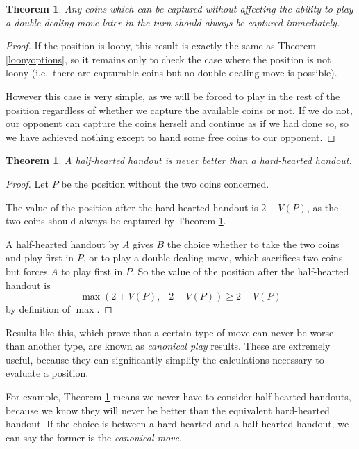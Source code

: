 \documentclass[a4paper,twocolumn]{article}
\newtheorem{freecoins}[thm]{Theorem}
\newtheorem{halfheartedbad}[thm]{Theorem}
\begin{document}
\begin{freecoins}\label{freecoins}
  Any coins which can be captured without affecting the ability to
  play a double-dealing move later in the turn should always be
  captured immediately.
\end{freecoins}

\begin{proof}
  If the position is loony, this result is exactly the same as Theorem
  \ref{loonyoptions}, so it remains only to check the case where the
  position is not loony (i.e.\ there are capturable coins but no
  double-dealing move is possible).

  However this case is very simple, as we will be forced to play in
  the rest of the position regardless of whether we capture the
  available coins or not. If we do not, our opponent can capture the
  coins herself and continue as if we had done so, so we have achieved
  nothing except to hand some free coins to our opponent.
\end{proof}

\begin{halfheartedbad}\label{halfheartedbad}
  A half-hearted handout is never better than a hard-hearted handout.
\end{halfheartedbad}
\begin{proof}
  Let $P$ be the position without the two coins concerned.

  The value of the position after the hard-hearted handout is
  $2+V(P)$, as the two coins should always be captured by Theorem
  \ref{freecoins}.

  A half-hearted handout by $A$ gives $B$ the choice whether to take
  the two coins and play first in $P$, or to play a double-dealing
  move, which sacrifices two coins but forces $A$ to play first in
  $P$. So the value of the position after the half-hearted handout
  is $$\max(2+V(P),-2-V(P)) \ge 2+V(P)$$ by definition of $\max$.
\end{proof}

Results like this, which prove that a certain type of move can never
be worse than another type, are known as \emph{canonical play}
results. These are extremely useful, because they can significantly
simplify the calculations necessary to evaluate a position.

For example, Theorem \ref{halfheartedbad} means we never have to
consider half-hearted handouts, because we know they will never be
better than the equivalent hard-hearted handout. If the choice is
between a hard-hearted and a half-hearted handout, we can say the
former is the \emph{canonical move}.
\end{document}
